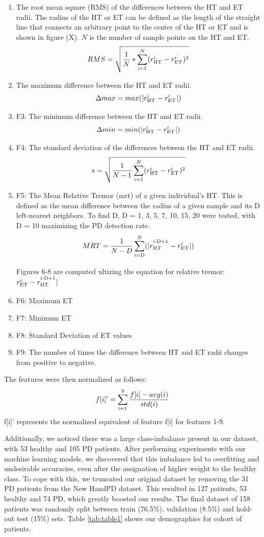 \documentclass[pmlr,twocolumn,10pt]{jmlr} %
\let\SUP\textsuperscript
\begin{document}
\begin{enumerate}
\item The root mean square (RMS) of the differences between the HT and ET radii. The radius of the HT or ET can be defined as the length of the straight line that connects an arbitrary point to the center of the HT or ET and is shown in figure (X). $N$ is the number of sample points on the HT and ET.
\[RMS = \sqrt{\frac{1}{N} * \sum_\SUP{i=1}^N(r_\SUP{HT}^i - r_\SUP{ET}^i)^2}\]

\item The maximum difference between the HT and ET radii. 
\[\Delta max = max(|r_\SUP{HT}^i - r_\SUP{ET}^i|)\]

\item F3: The minimum difference between the HT and ET radii. 
\[\Delta min = min(|r_\SUP{HT}^i - r_\SUP{ET}^i|)\]

\item F4: The standard deviation of the differences between the HT and ET radii. 
\[s = \sqrt{\frac{1}{N-1}\sum_{i=1}^N(r_\SUP{HT}^i - r_\SUP{ET}^i)^2}\]

\item F5: The Mean Relative Tremor (mrt) of a given individual’s HT. This is defined as the mean difference between the radius of a given sample and its D left-nearest neighbors. To find D, D = {1, 3, 5, 7, 10, 15, 20} were tested, with D = 10 maximizing the PD detection rate. 
\[MRT = \frac{1}{N-D}\sum_\SUP{i=D}^N(|r_\SUP{HT}^\SUP{i-D+1} - r_\SUP{ET}^i|)\]

Figures 6-8 are computed ultizing the equation for relative tremor: $r_\SUP{ET}^i - r_\SUP{HT}^\SUP{i-D+1}|$
\item F6: Maximum ET
\item F7: Minimum ET
\item F8: Standard Deviation of ET values
\item F9: The number of times the difference between HT and ET radii changes from positive to negative.
\end{enumerate}

The features were then normalized as follows:
\[f[i]' = \sum_\SUP{i=1}^9\frac{f[i] - avg(i)}{std(i)}\]
f[i]' represents the normalized equivalent of feature f[i] for features 1-9.

Additionally, we noticed there was a large class-imbalance present in our dataset, with 53 healthy and 105 PD patients. After performing experiments with our machine learning models, we discovered that this imbalance led to overfitting and undesirable accuracies, even after the assignation of higher weight to the healthy class. To cope with this, we truncated our original dataset by removing the 31 PD patients from the New HandPD dataset. This resulted in 127 patients, 53 healthy and 74 PD, which greatly boosted our results. The final dataset of 158 patients was randomly split between train (76.5\%), validation (8.5\%) and hold-out test (15\%) sets. Table \ref{tab:table1} shows our demographics for cohort of patients. 
\end{document}
